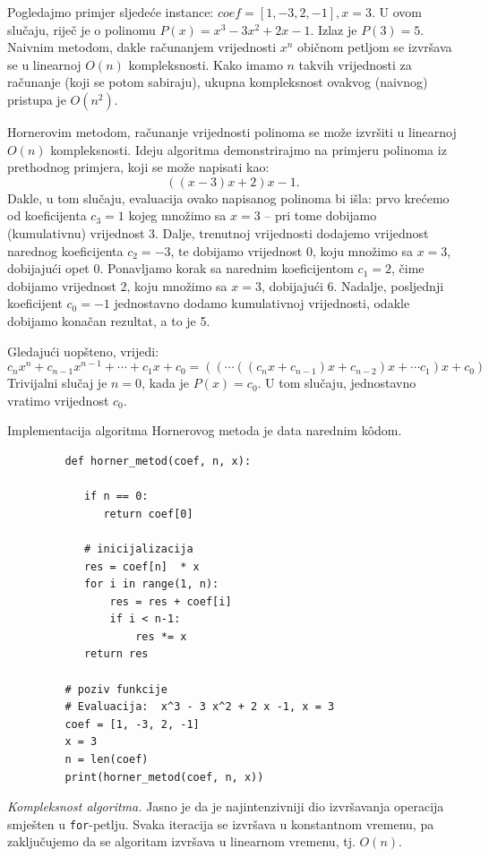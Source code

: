 \begin{solution}
	Pogledajmo primjer sljedeće instance: $coef = [1, -3, 2, -1], x = 3$. U ovom slučaju, riječ je o polinomu $P(x) =  x^3 - 3 x^2 + 2 x -1$. Izlaz    je $ P(3) = 5$.  \\
	
	Naivnim metodom, dakle računanjem vrijednosti $x^n$ običnom petljom se izvršava se u linearnoj $O(n)$ kompleksnosti. Kako imamo $n$ takvih vrijednosti za računanje (koji se potom sabiraju), ukupna kompleksnost ovakvog (naivnog) pristupa je $O(n^2)$.
	
	 Hornerovim metodom, računanje vrijednosti polinoma se može izvršiti u linearnoj $O(n)$ kompleksnosti. Ideju algoritma demonstrirajmo na primjeru polinoma iz prethodnog primjera, koji se može napisati kao:  $$((x - 3)x + 2)x -1.$$ 
	 Dakle, u tom slučaju, evaluacija ovako napisanog polinoma bi išla: prvo krećemo od koeficijenta $c_3=1$ kojeg množimo sa $x=3$ -- pri tome dobijamo (kumulativnu) vrijednost 3. Dalje, trenutnoj vrijednosti   dodajemo vrijednost narednog koeficijenta $c_2 = -3$, te dobijamo vrijednost 0, koju množimo sa $x=3$, dobijajući opet 0. Ponavljamo korak sa narednim koeficijentom $c_1 = 2$, čime dobijamo vrijednost 2, koju množimo sa $x=3$, dobijajući 6. Nadalje, posljednji koeficijent $c_0=-1$ jednostavno dodamo kumulativnoj vrijednosti, odakle dobijamo konačan rezultat, a to je 5. 
	 
	 Gledajući uopšteno, vrijedi: 
	 $$ c_n x^n + c_{n-1}x^{n-1} + \cdots + c_1 x + c_0 = ((\cdots ((c_n x + c_{n-1})x + c_{n-2})x + \cdots c_1) x + c_0  )$$
	 Trivijalni slučaj je  $n=0$, kada je $P(x) = c_0$. U tom slučaju, jednostavno vratimo vrijednost $ c_0$.
	 
	  
	 Implementacija algoritma Hornerovog metoda je data narednim k\^odom. 
	 
	 \begin{verbatim}
	 	 def horner_metod(coef, n, x):
	 	    
	 	    if n == 0: 
	 	       return coef[0]
	 	    
	 	 	# inicijalizacija
	 	 	res = coef[n]  * x
	 	 	for i in range(1, n):
	 	     	res = res + coef[i]
	 	     	if i < n-1:
	 	     		res *= x
	 	 	return res
	 	 
	 	 # poziv funkcije
	 	 # Evaluacija:  x^3 - 3 x^2 + 2 x -1, x = 3
	 	 coef = [1, -3, 2, -1]
	 	 x = 3
	 	 n = len(coef)
	 	 print(horner_metod(coef, n, x))
	 \end{verbatim}

\textit{Kompleksnost algoritma.}  Jasno je da je najintenzivniji dio izvršavanja operacija smješten u \texttt{for}-petlju. Svaka iteracija se izvršava u konstantnom vremenu, pa zaključujemo da se algoritam izvršava u linearnom vremenu, tj. $O(n)$.  
\end{solution}
 
